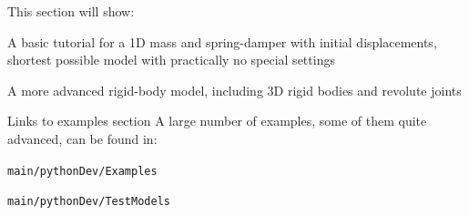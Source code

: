 %
This section will show:
\bi
  \item A basic tutorial for a 1D mass and spring-damper with initial displacements, shortest possible model with practically no special settings
  \item A more advanced rigid-body model, including 3D rigid bodies and revolute joints
  \item Links to examples section
\ei
%
A large number of examples, some of them quite advanced, can be found in:
\bi
  \item[] \texttt{main/pythonDev/Examples}
  \item[] \texttt{main/pythonDev/TestModels}
\ei

